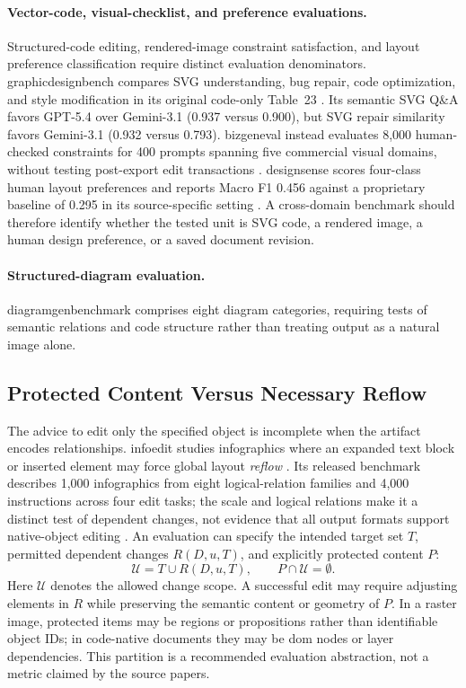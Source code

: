 \paragraph{Vector-code, visual-checklist, and preference evaluations.}
Structured-code editing, rendered-image constraint satisfaction, and layout preference classification require distinct evaluation denominators.
\ac{graphicdesignbench} compares SVG understanding, bug repair, code optimization, and style modification in its original code-only Table~23 \citep{deganutti2026gdb}.
Its semantic SVG Q\&A favors GPT-5.4 over Gemini-3.1 (0.937 versus 0.900), but SVG repair similarity favors Gemini-3.1 (0.932 versus 0.793).
\ac{bizgeneval} instead evaluates 8,000 human-checked constraints for 400 prompts spanning five commercial visual domains, without testing post-export edit transactions \citep{li2026bizgeneval}.
\ac{designsense} scores four-class human layout preferences and reports Macro F1 0.456 against a proprietary baseline of 0.295 in its source-specific setting \citep{designsense2026}.
A cross-domain benchmark should therefore identify whether the tested unit is SVG code, a rendered image, a human design preference, or a saved document revision.

\paragraph{Structured-diagram evaluation.}
\ac{diagramgenbenchmark} comprises eight diagram categories, requiring tests of semantic relations and code structure rather than treating output as a natural image alone.

\subsection{Protected Content Versus Necessary Reflow}
The advice to edit only the specified object is incomplete when the artifact encodes relationships.
\ac{infoedit} studies infographics where an expanded text block or inserted element may force global layout \emph{reflow} \citep{yang2026infoedit}.
Its released benchmark describes 1,000 infographics from eight logical-relation families and 4,000 instructions across four edit tasks; the scale and logical relations make it a distinct test of dependent changes, not evidence that all output formats support native-object editing \citep{yang2026infoedit}.
An evaluation can specify the intended target set $T$, permitted dependent changes $R(D,u,T)$, and explicitly protected content $P$:
\begin{equation}
\mathcal{U}=T\cup R(D,u,T),\qquad P\cap\mathcal{U}=\emptyset.
\label{eq:reflow}
\end{equation}
Here $\mathcal{U}$ denotes the allowed change scope.
A successful edit may require adjusting elements in $R$ while preserving the semantic content or geometry of $P$.
In a raster image, protected items may be regions or propositions rather than identifiable object IDs; in code-native documents they may be \ac{dom} nodes or layer dependencies.
This partition is a recommended evaluation abstraction, not a metric claimed by the source papers.

